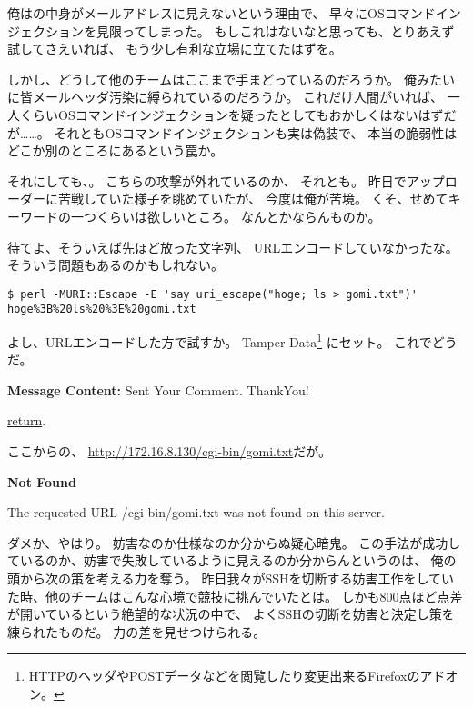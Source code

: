 俺はの中身がメールアドレスに見えないという理由で、
早々にOSコマンドインジェクションを見限ってしまった。
もしこれはないなと思っても、とりあえず試してさえいれば、
もう少し有利な立場に立てたはずを。

しかし、どうして他のチームはここまで手まどっているのだろうか。
俺みたいに皆メールヘッダ汚染に縛られているのだろうか。
これだけ人間がいれば、
一人くらいOSコマンドインジェクションを疑ったとしてもおかしくはないはずだが……。
それともOSコマンドインジェクションも実は偽装で、
本当の脆弱性はどこか別のところにあるという罠か。

それにしても、。
こちらの攻撃が外れているのか、
それとも。
昨日でアップローダーに苦戦していた様子を眺めていたが、
今度は俺が苦境。
くそ、せめてキーワードの一つくらいは欲しいところ。
なんとかならんものか。

待てよ、そういえば先ほど放った文字列、
URLエンコードしていなかったな。
そういう問題もあるのかもしれない。

\begin{lstlisting}
$ perl -MURI::Escape -E 'say uri_escape("hoge; ls > gomi.txt")'
hoge%3B%20ls%20%3E%20gomi.txt
\end{lstlisting}

よし、URLエンコードした方で試すか。
Tamper Data\footnote{HTTPのヘッダやPOSTデータなどを閲覧したり変更出来るFirefoxのアドオン。}%
にセット。
これでどうだ。

\begin{itembox}[c]{\textbf{Message Content:}}
Sent Your Comment. ThankYou!

\underline{return}. 
\end{itembox}

ここからの、
\url{http://172.16.8.130/cgi-bin/gomi.txt}だが。

\begin{itembox}[c]{\textbf{Not Found}}

The requested URL /cgi-bin/gomi.txt was not found on this server.
\end{itembox}

ダメか、やはり。
妨害なのか仕様なのか分からぬ疑心暗鬼。
この手法が成功しているのか、妨害で失敗しているように見えるのか分からんというのは、
俺の頭から次の策を考える力を奪う。
昨日我々がSSHを切断する妨害工作をしていた時、他のチームはこんな心境で競技に挑んでいたとは。
しかも800点ほど点差が開いているという絶望的な状況の中で、
よくSSHの切断を妨害と決定し策を練られたものだ。
力の差を見せつけられる。


